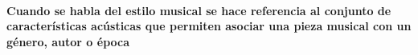 
\paragraph{Cuando se habla del estilo musical se hace referencia al conjunto de características acústicas que permiten asociar una pieza musical con un género, autor o época\cite{rae-estilo} }

%
%
%
%
%
%

